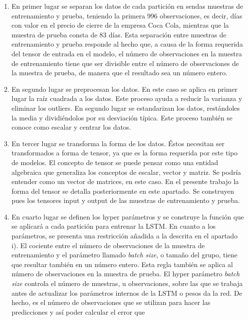 \documentclass[]{DissertateUSU}
\begin{document}
\begin{enumerate}
\def\labelenumi{\roman{enumi})}
\item
  En primer lugar se separan los datos de cada partición en sendas
  muestras de entrenamiento y prueba, teniendo la primera 996
  observaciones, es decir, días con valor en el precio de cierre de la
  empresa Coca Cola, mientras que la muestra de prueba consta de 83
  días. Esta separación entre muestras de entrenamiento y prueba
  responde al hecho que, a causa de la forma requerida del tensor de
  entrada en el modelo, el número de observaciones en la muestra de
  entrenamiento tiene que ser divisible entre el número de observaciones
  de la muestra de prueba, de manera que el resultado sea un número
  entero.
\item
  En segundo lugar se preprocesan los datos. En este caso se aplica en
  primer lugar la raíz cuadrada a los datos. Este proceso ayuda a
  reducir la varianza y eliminar los outliers. En segundo lugar se
  estandarizan los datos, restándoles la media y dividiéndolos por su
  desviación típica. Este proceso también se conoce como escalar y
  centrar los datos.
\item
  En tercer lugar se transforma la forma de los datos. Éstos necesitan
  ser transformados a forma de tensor, ya que es la forma requerida por
  este tipo de modelos. El concepto de tensor se puede pensar como una
  entidad algebraica que generaliza los conceptos de escalar, vector y
  matriz. Se podría entender como un vector de matrices, en este caso.
  En el presente trabajo la forma del tensor se detalla posteriormente
  en este apartado. Se construyen pues los tensores input y output de
  las muestras de entrenamiento y prueba.
\item
  En cuarto lugar se definen los hyper parámetros y se construye la
  función que se aplicará a cada partición para entrenar la LSTM. En
  cuanto a los parámetros, se presenta una restricción añadida a la
  descrita en el apartado i). El cociente entre el número de
  observaciones de la muestra de entrenamiento y el parámetro llamado
  \emph{batch size}, o tamaño del grupo, tiene que resultar también en
  un número entero. Esta regla también se aplica al número de
  observaciones en la muestra de prueba. El hyper parámetro \emph{batch
  size} controla el número de muestras, u observaciones, sobre las que
  se trabaja antes de actualizar los parámetros internos de la LSTM o
  pesos da la red. De hecho, es el número de observaciones que se
  utilizan para hacer las predicciones y así poder calcular el error que

\end{enumerate}
\end{document}
